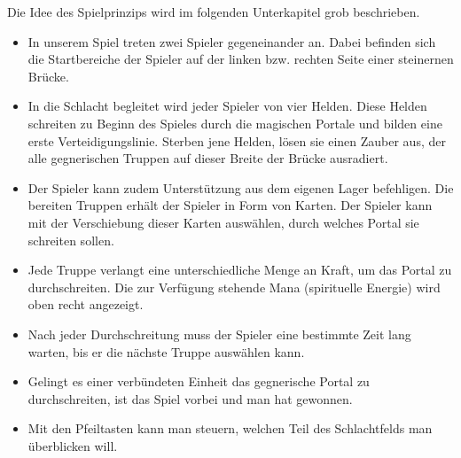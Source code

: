 Die Idee des Spielprinzips wird im folgenden Unterkapitel grob beschrieben.\
\begin{itemize}
    \item In unserem Spiel treten zwei Spieler gegeneinander an. Dabei befinden sich die Startbereiche der Spieler auf der linken bzw. rechten Seite einer steinernen Brücke.
    \item In die Schlacht begleitet wird jeder Spieler von vier Helden. Diese Helden schreiten zu Beginn des Spieles durch die magischen Portale und bilden eine erste Verteidigungslinie.
    Sterben jene Helden, lösen sie einen Zauber aus, der alle gegnerischen Truppen auf dieser Breite der Brücke ausradiert.
    \item Der Spieler kann zudem Unterstützung aus dem eigenen Lager befehligen. Die bereiten Truppen erhält der Spieler in Form von Karten. Der Spieler kann mit der Verschiebung dieser Karten auswählen, durch welches Portal sie schreiten sollen.
    \item Jede Truppe verlangt eine unterschiedliche Menge an Kraft, um das Portal zu durchschreiten. Die zur Verfügung stehende Mana (spirituelle Energie) wird oben recht angezeigt.
    \item Nach jeder Durchschreitung muss der Spieler eine bestimmte Zeit lang warten, bis er die nächste Truppe auswählen kann.
    \item Gelingt es einer verbündeten Einheit das gegnerische Portal zu durchschreiten, ist das Spiel vorbei und man hat gewonnen. 
    \item Mit den Pfeiltasten kann man steuern, welchen Teil des Schlachtfelds man überblicken will.
\end{itemize}



